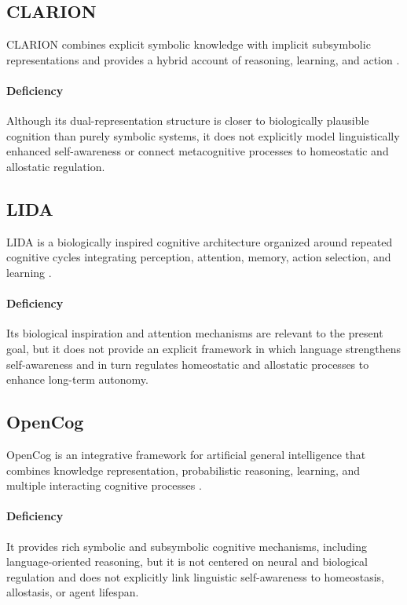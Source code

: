 \documentclass[a4paper]{article}
\begin{document}
      \subsection{CLARION}
      CLARION combines explicit symbolic knowledge with implicit subsymbolic representations and provides a hybrid account of reasoning, learning, and action \cite{sun-2006-clarion-framework}.

      \paragraph{Deficiency}
      Although its dual-representation structure is closer to biologically plausible cognition than purely symbolic systems, it does not explicitly model linguistically enhanced self-awareness or connect metacognitive processes to homeostatic and allostatic regulation.

      \subsection{LIDA}
      LIDA is a biologically inspired cognitive architecture organized around repeated cognitive cycles integrating perception, attention, memory, action selection, and learning \cite{franklin-2013-lida-theory}.

      \paragraph{Deficiency}
      Its biological inspiration and attention mechanisms are relevant to the present goal, but it does not provide an explicit framework in which language strengthens self-awareness and in turn regulates homeostatic and allostatic processes to enhance long-term autonomy.

      \subsection{OpenCog}
      OpenCog is an integrative framework for artificial general intelligence that combines knowledge representation, probabilistic reasoning, learning, and multiple interacting cognitive processes \cite{goertzel-2014-opencog-framework-artificial-general-intelligence}.

      \paragraph{Deficiency}
      It provides rich symbolic and subsymbolic cognitive mechanisms, including language-oriented reasoning, but it is not centered on neural and biological regulation and does not explicitly link linguistic self-awareness to homeostasis, allostasis, or agent lifespan.
\end{document}
